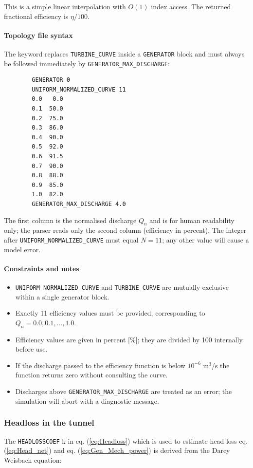 \documentclass[a4paper, 12pt]{report}
\begin{document}
	\noindent This is a simple linear interpolation with $O(1)$ index access. The returned fractional efficiency is $\eta / 100$.
	
	\paragraph{Topology file syntax}
	
	The keyword replaces \texttt{TURBINE\_CURVE} inside a \texttt{GENERATOR} block and must always be followed immediately by \texttt{GENERATOR\_MAX\_DISCHARGE}:
	
	\begin{verbatim}
		GENERATOR 0
		UNIFORM_NORMALIZED_CURVE 11
		0.0   0.0
		0.1  50.0
		0.2  75.0
		0.3  86.0
		0.4  90.0
		0.5  92.0
		0.6  91.5
		0.7  90.0
		0.8  88.0
		0.9  85.0
		1.0  82.0
		GENERATOR_MAX_DISCHARGE 4.0
	\end{verbatim}
	
	\noindent The first column is the normalised discharge $Q_n$ and is for human readability only; the parser reads only the second column (efficiency in percent). The integer after \texttt{UNIFORM\_NORMALIZED\_CURVE} must equal $N = 11$; any other value will cause a model error.
	
	\paragraph{Constraints and notes}
	
	\begin{itemize}
		\item \texttt{UNIFORM\_NORMALIZED\_CURVE} and \texttt{TURBINE\_CURVE} are mutually exclusive within a single generator block.
		\item Exactly 11 efficiency values must be provided, corresponding to $Q_n = 0.0, 0.1, \ldots, 1.0$.
		\item Efficiency values are given in percent [\%]; they are divided by 100 internally before use.
		\item If the discharge passed to the efficiency function is below $10^{-6}$ m$^3$/s the function returns zero without consulting the curve.
		\item Discharges above \texttt{GENERATOR\_MAX\_DISCHARGE} are treated as an error; the simulation will abort with a diagnostic message.
	\end{itemize}
	

    \subsubsection{Headloss in the tunnel}
    The \texttt{HEADLOSSCOEF} k in eq. (\ref{eq:Headloss}) which is used to estimate head loss eq. (\ref{eq:Head_net}) and eq. (\ref{eq:Gen_Mech_power}) is derived from the Darcy Weisbach equation: 
\end{document}

